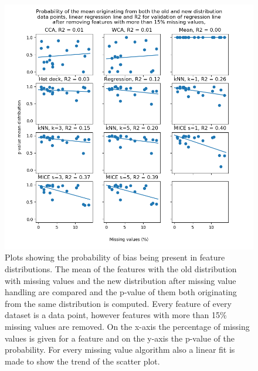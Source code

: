 \documentclass[10pt,a4paper]{report}
\begin{document}
	\begin{figure}[]
		\centering
		\includegraphics[width=\textwidth]{Mean_Dist_Extra_ACA.PNG}
		\caption{Plots showing the probability of bias being present in feature distributions. The mean of the features with the old distribution with missing values and the new distribution after missing value handling are compared and the p-value of them both originating from the same distribution is computed. Every feature of every dataset is a data point, however features with more than 15\% missing values are removed. On the x-axis the percentage of missing values is given for a feature and on the y-axis the p-value of the probability. For every missing value algorithm also a linear fit is made to show the trend of the scatter plot.}
		\label{fig:PMeanFitsACA}
	\end{figure}
	
\end{document}
